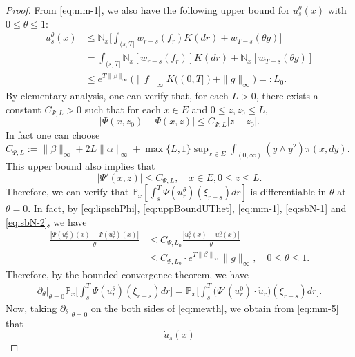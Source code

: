\begin{proof}
	From \eqref{eq:mm-1}, we also have the following upper bound for $u_s^\theta (x)$ with $0 \leq \theta \leq 1$:
\begin{equation}\label{eq:uppBoundUThet}\begin{split}
	u_s^\theta(x)
	&\leq \mathbb N_x \Big[\int_{(s,T]} w_{r-s}(f_r) K(dr) + w_{T-s}(\theta g)\Big]\\
	&= \int_{(s,T]} \mathbb N_x[w_{r-s}(f_r)] K(dr ) + \mathbb N_x[w_{T-s}(\theta g)]\\
	&\leq e^{T\|\beta\|_\infty} \big( \|f\|_\infty K((0,T])+\|g\|_\infty \big)
	= : L_0.
\end{split}\end{equation}
	By elementary analysis, one can verify that, for each $L>0$, there exists a constant $C_{\Psi,L}>0$ such that for each $x\in E$ and $0\leq z, z_0 \leq L$,
\begin{equation}\label{eq:lipschPhi}
	|\Psi(x,z_0) - \Psi(x,z)|
	\leq C_{\Psi,L} |z - z_0|.
\end{equation}
	In fact one can choose
	$C_{\Psi,L} := \|\beta\|_\infty + 2L\|\alpha\|_\infty + \max\{L,1\} \sup_{x\in E} \int_{(0,\infty)} (y \wedge y^2) \pi(x,dy)$.
	This upper bound also implies that
\[
	|\Psi' (x,z)|
	\leq C_{\Psi,L},
	\quad x \in E, 0 \leq z \leq L.
\]
	Therefore, we can verify that $\mathbb P_x[\int_s^T \Psi(u^\theta_r)(\xi_{r-s}) dr]$ is differentiable in $\theta$ at $\theta = 0$.
	In fact, by \eqref{eq:lipschPhi}, \eqref{eq:uppBoundUThet}, \eqref{eq:mm-1}, \eqref{eq:sbN-1} and \eqref{eq:sbN-2}, we have
\[\begin{split}
	\frac {|\Psi(u_r^\theta)(x)- \Psi(u^0_r)(x)|} {\theta}
	&\leq C_{\Psi,L_0} \frac {|u_r^\theta(x) - u_r^0(x)|} {\theta}\\
	&\leq C_{\Psi,L_0} \cdot e^{T \|\beta\|_\infty} \|g\|_\infty,
	\quad 0 \leq \theta \leq 1.
\end{split}\]
	Therefore, by the bounded convergence theorem, we have
\begin{equation}\label{eq:mm-5}\begin{split}
	\partial_\theta|_{\theta =0} \mathbb P_x \Big[ \int_s^T \Psi(u_r^\theta)(\xi_{r-s}) dr\Big]
	= \mathbb P_x \Big[ \int_s^T \big(\Psi'(u_r^0) \cdot \dot u_r \big)(\xi_{r-s}) dr \Big].
\end{split}\end{equation}
	Now, taking $\partial_\theta|_{\theta=0}$ on the both sides of \eqref{eq:mewth}, we obtain from \eqref{eq:mm-5} that
\begin{equation}\label{eq:mm-2}
	\dot u_s (x)

\end{equation}
\end{proof}
